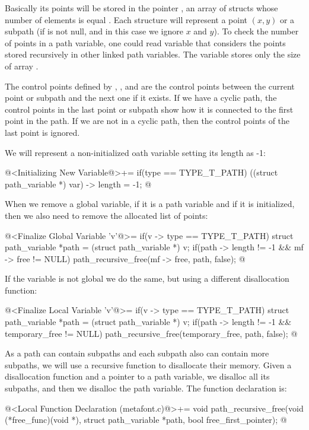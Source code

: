 Basically its points will be stored in the
pointer , an array of structs whose number of
elements is equal . Each structure will represent a
point $(x, y)$ or a subpath (if  is not null, and
in this case we ignore $x$ and $y$). To check the number of points in
a path variable, one could read variable 
that considers the points stored recursively in other linked path
variables. The variable  stores only the size of
array .

The control points defined
by , , 
and  are the control points between the current point
or subpath and the next one if it exists. If we have a cyclic path,
the control points in the last point or subpath show how it is
connected to the first point in the path. If we are not in a cyclic
path, then the control points of the last point is ignored.

We will represent a non-initialized oath variable setting its length
as -1:

\iniciocodigo
@<Initializing New Variable@>+=
if(type == TYPE_T_PATH){
  ((struct path_variable *) var) -> length = -1;
}
@
\fimcodigo

When we remove a global variable, if it is a path variable and if it
is initialized, then we also need to remove the allocated list of
points:

\iniciocodigo
@<Finalize Global Variable 'v'@>=
if(v -> type == TYPE_T_PATH){
  struct path_variable *path = (struct path_variable *) v;
  if(path -> length != -1 && mf -> free != NULL)
    path_recursive_free(mf -> free, path, false);
}
@
\fimcodigo

If the variable is not global we do the same, but using a different
disallocation function:

\iniciocodigo
@<Finalize Local Variable 'v'@>=
if(v -> type == TYPE_T_PATH){
  struct path_variable *path = (struct path_variable *) v;
  if(path -> length != -1 && temporary_free != NULL)
    path_recursive_free(temporary_free, path, false);
}
@
\fimcodigo

As a path can contain subpaths and each subpath also can contain more
subpaths, we will use a recursive function to disallocate their
memory. Given a disallocation function and a pointer to a path
variable, we disalloc all its subpaths, and then we disalloc the path
variable. The function declaration is:

\iniciocodigo
@<Local Function Declaration (metafont.c)@>+=
void path_recursive_free(void (*free_func)(void *),
                         struct path_variable *path,
                         bool free_first_pointer);
@
\fimcodigo

